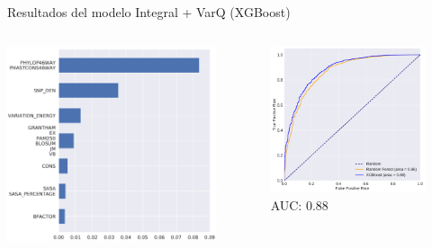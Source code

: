\documentclass[
  spanish,
  ignorenonframetext,
]{beamer}
\begin{document}
\begin{frame}{Resultados del modelo Integral + VarQ (XGBoost)}
\protect\hypertarget{resultados-del-modelo-integral-varq-xgboost}{}

\begin{columns}[T]
\begin{column}{0.48\textwidth}
\includegraphics[width=2.44792in,height=\textheight]{integral_varq_importance_cluster_xgb.pdf}
\end{column}

\begin{column}{0.48\textwidth}
\begin{figure}
\centering
\includegraphics[width=1.82292in,height=\textheight]{auc_varq_integral.pdf}
\caption{AUC: 0.88}
\end{figure}
\end{column}
\end{columns}

\end{frame}
\end{document}

